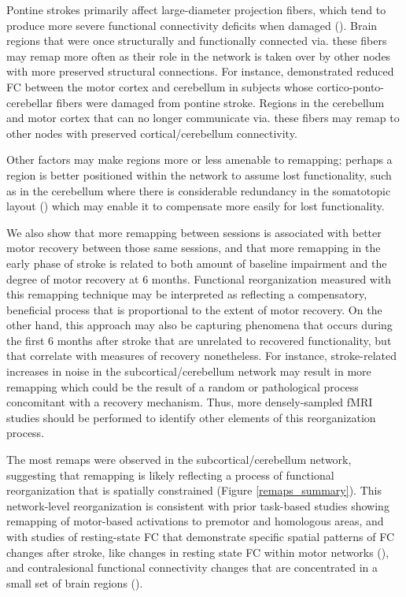 \documentclass[phd,tocprelim]{cornell}
\begin{document}
    Pontine strokes primarily affect large-diameter projection fibers, which tend to produce more severe functional connectivity deficits when damaged (\cite{Griffis2020-hx}). Brain regions that were once structurally and functionally connected via. these fibers may remap more often as their role in the network is taken over by other nodes with more preserved structural connections. For instance, \cite{Lu2011-ow} demonstrated reduced FC between the motor cortex and cerebellum in subjects whose cortico-ponto-cerebellar fibers were damaged from pontine stroke. Regions in the cerebellum and motor cortex that can no longer communicate via. these fibers may remap to other nodes with preserved cortical/cerebellum connectivity.
    
     Other factors may make regions more or less amenable to remapping; perhaps a region is better positioned within the network to assume lost functionality, such as in the cerebellum where there is considerable redundancy in the somatotopic layout (\cite{Mottolese2013-sd}) which may enable it to compensate more easily for lost functionality.
    
    We also show that more remapping between sessions is associated with better motor recovery between those same sessions, and that more remapping in the early phase of stroke is related to both amount of baseline impairment and the degree of motor recovery at 6 months. Functional reorganization measured with this remapping technique may be interpreted as reflecting a compensatory, beneficial process that is proportional to the extent of motor recovery. On the other hand, this approach may also be capturing phenomena that occurs during the first 6 months after stroke that are unrelated to recovered functionality, but that correlate with measures of recovery nonetheless. For instance, stroke-related increases in noise in the subcortical/cerebellum network may result in more remapping which could be the result of a random or pathological process concomitant with a recovery mechanism. Thus, more densely-sampled fMRI studies should be performed to identify other elements of this reorganization process. 
        
    The most remaps were observed in the subcortical/cerebellum network, suggesting that remapping is likely reflecting a process of functional reorganization that is spatially constrained (Figure \ref{remaps_summary}). This network-level reorganization is consistent with prior task-based studies showing remapping of motor-based activations to premotor and homologous areas, and with studies of resting-state FC that demonstrate specific spatial patterns of FC changes after stroke, like changes in resting state FC within motor networks (\cite{Zhang2016-vg}), and contralesional functional connectivity changes that are concentrated in a small set of brain regions (\cite{Yourganov2021-hd}).
     
\end{document}
